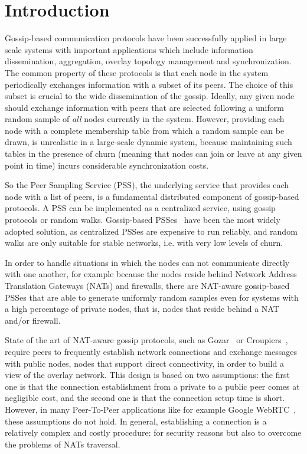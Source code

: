 
\chapter*{Introduction} %
\label{sommario}

Gossip-based communication protocols have been successfully applied in large scale systems with important applications which include information dissemination, aggregation, overlay topology management and synchronization. The common property of these protocols is that each node in the system periodically exchanges information with a subset of its peers. The choice of this subset is crucial to the wide dissemination of the gossip. Ideally, any given node should exchange information with peers that are selected following a uniform random sample of \textit{all} nodes currently in the system. However, providing each node with a complete membership table from which a random sample can be drawn, is unrealistic in a large-scale dynamic system, because maintaining such tables in the presence of churn (meaning that nodes can join or leave at any given point in time) incurs considerable synchronization costs. 

So the Peer Sampling Service (PSS), the underlying service that provides each node with a list of peers, is a fundamental distributed component of gossip-based protocols. A PSS can be implemented as a centralized service, using gossip protocols or random walks. Gossip-based PSSes~\cite{gossip_protocol} have been the most widely adopted solution, as centralized PSSes are expensive to run reliably, and random walks are only suitable for stable networks, i.e. with very low levels of churn. 

In order to handle situations in which the nodes can not communicate directly with one another, for example because the nodes reside behind Network Address Translation Gateways (NATs) and firewalls, there are NAT-aware gossip-based PSSes that are able to generate uniformly random samples even for systems with a high percentage of private nodes, that is, nodes that reside behind a NAT and/or firewall. 

State of the art of NAT-aware gossip protocols, such as Gozar~\cite{gozar} or Croupiers~\cite{croupier}, require peers to frequently establish network connections and exchange messages with public nodes, nodes that support direct connectivity, in order to build a view of the overlay network. This design is based on two assumptions: the first one is that the connection establishment from a private to a public peer comes at negligible cost, and the second one is that the connection setup time is short. However, in many Peer-To-Peer applications like for example Google WebRTC~\cite{webrtc}, these assumptions do not hold. In general, establishing a connection is a relatively complex and costly procedure: for security reasons but also to overcome the problems of NATs traversal. 


